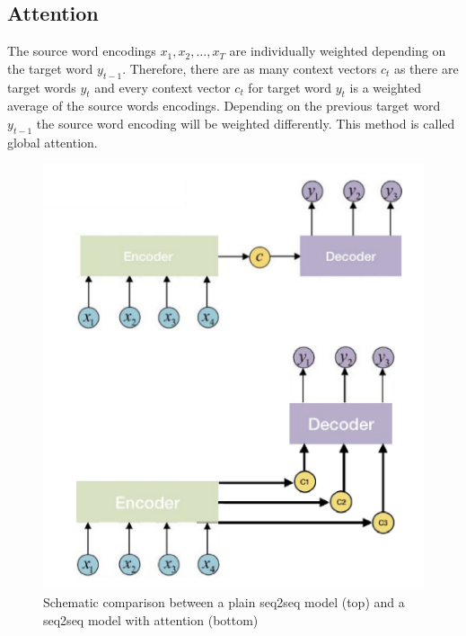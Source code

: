 \documentclass[11pt]{article}
\begin{document}
\subsection{Attention}
\begin{minipage}{0.65\linewidth}
	The source word encodings $x_1,x_2, \dots, x_T$ are individually weighted depending on the target word $y_{t-1}$. Therefore, there are as many context vectors $c_t$ as there are target words $y_t$ and every context vector $c_t$ for target word $y_t$ is a weighted average of the source words encodings. Depending on the previous target word $y_{t-1}$ the source word encoding will be weighted differently. This method is called global attention\footnotemark.
\end{minipage}
\begin{minipage}{0.3\linewidth}
\begin{figure}[H]
	\includegraphics[width=\linewidth]{img/seq2seq_attention2}
	\caption{Schematic comparison between a plain seq2seq model (top) and a seq2seq model with attention (bottom)}
	\label{fig:seq2seqattention}
\end{figure}
\end{minipage}
\end{document}
